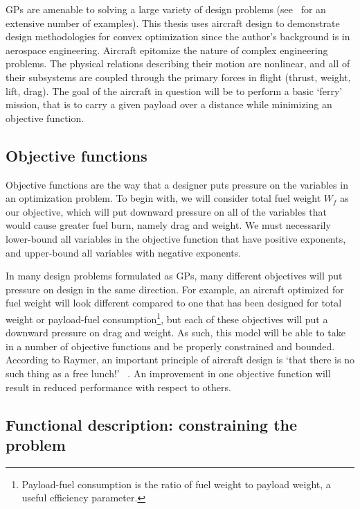 \gls{GP}s are amenable to solving a large variety of design problems (see~\cite{gpintro} for an
extensive number of examples). This thesis uses aircraft design to demonstrate
design methodologies for convex optimization since the author's background is in aerospace engineering.
Aircraft epitomize the nature of complex engineering problems. The physical 
relations describing their motion are nonlinear, and all of their subsystems are 
coupled through the primary forces in flight (thrust, weight, lift, drag).
The goal of the aircraft in question will be to perform a basic `ferry' mission, that
is to carry a given payload
over a distance while minimizing an objective function.

\subsection{Objective functions}
\label{s:objective}

Objective functions are the way that a designer puts pressure on the variables in an
optimization problem. To begin with, we will consider
total fuel weight $W_f$ as our objective, which will put
downward pressure on all of the variables that would cause greater fuel burn, namely
drag and weight. We must necessarily lower-bound all variables in the objective function
that have positive exponents, and upper-bound all variables with negative exponents.

In many design problems
formulated as \gls{GP}s, many different objectives will put pressure on design
in the same direction. For example, an aircraft optimized for fuel weight will look
different compared to one
that has been designed for total weight or payload-fuel consumption\footnote{Payload-fuel consumption
is the ratio of fuel weight to payload weight, a useful efficiency parameter.}, but each
of these objectives will put a downward pressure on drag and weight.
As such, this model will be able to take in a number of objective functions
and be properly constrained and bounded. According to Raymer, an important
principle of aircraft design is `that there is no such thing as a free lunch!'
~\cite[pg.26]{raymer}. An improvement in one objective function
will result in reduced performance with respect to others.

\subsection{Functional description: constraining the problem}

